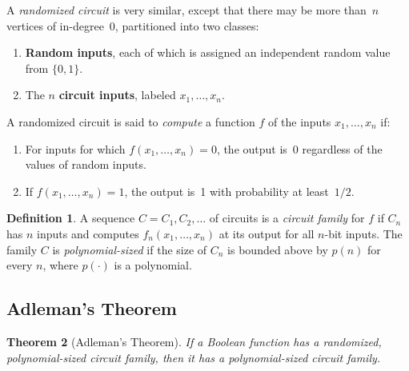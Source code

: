 \documentclass[twoside,12pt]{book}
\theoremstyle{plain}
\newtheorem{theorem}{Theorem}[chapter]
\theoremstyle{definition}
\newtheorem{definition}[theorem]{Definition}
\theoremstyle{remark}
\begin{document}
A \emph{randomized circuit} is very similar, except that there may be more
than~$n$ vertices of in-degree~0, partitioned into two classes:
\begin{enumerate}
  \item \textbf{Random inputs}, each of which is assigned an independent
    random value from $\{0,1\}$.
  \item The $n$ \textbf{circuit inputs}, labeled $x_1,\ldots,x_n$.
\end{enumerate}

A randomized circuit is said to \emph{compute} a function $f$ of the inputs
$x_1,\ldots,x_n$ if:
\begin{enumerate}
  \item For inputs for which $f(x_1,\ldots,x_n)=0$, the output is~0 regardless
    of the values of random inputs.
  \item If $f(x_1,\ldots,x_n)=1$, the output is~1 with probability at
    least~$1/2$.
\end{enumerate}

\begin{definition}
A sequence $C=C_1,C_2,\ldots$ of circuits is a \emph{circuit family} for $f$
if $C_n$ has $n$ inputs and computes $f_n(x_1,\ldots,x_n)$ at its output for
all $n$-bit inputs.  The family $C$ is \emph{polynomial-sized} if the size
of $C_n$ is bounded above by $p(n)$ for every $n$, where $p(\cdot)$ is a
polynomial.
\end{definition}

\subsection{Adleman's Theorem}

\begin{theorem}[Adleman's Theorem]
\label{thm:adleman}
If a Boolean function has a randomized, polynomial-sized circuit family, then
it has a polynomial-sized circuit family.
\end{theorem}
\end{document}
